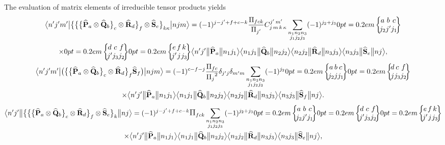 The evaluation of matrix elements of irreducible tensor products yields
\begin{gather}
\braOket{ n^{\prime} j^{\prime} m^{\prime}}{\bigl\{\bigl\{\bigl\{\widehat{\vect{P}}_{a} \otimes \widehat{\vect{Q}}_{b}\bigr\}_{c} \otimes \widehat{\vect{R}}_{d}\bigr\}_{f} \otimes \widehat{\vect{S}}_{e}\bigr\}_{k \kappa}}{n j m}=(-1)^{j-j^{\prime}+f+c-k} \frac{\Fact{f c k}}{\Fact{j^{\prime}}} 
\clebsch{j}{m}{k}{\kappa}{j^{\prime}}{m^{\prime}} \sum_{\substack{n_{1} n_{2} n_{3} \\
j_{1} j_{2} j_{3}}}(-1)^{j_{2}+j_{3}}
\sixj{a}{b}{c}{j_{2}}{j^{\prime}}{j_{1}} \notag\\
\times
\sixj{d}{c}{f}{j^{\prime}}{j_{3}}{j_{2}}
\sixj{e}{f}{k}{j^{\prime}}{j}{j_{3}}
\braOketred{ n^{\prime} j^{\prime}}{\widehat{\vect{P}}_{a}}{ n_{1} j_{1}}
\braOketred{ n_{1} j_{1}}{\widehat{\vect{Q}}_{b}}{ n_{2} j_{2}}
\braOketred{ n_{2} j_{2}}{\widehat{\vect{R}}_{d}}{ n_{3} j_{3}}
\braOketred{ n_{3} j_{3}}{\widehat{\vect{S}}_{e}}{ n j},  \label{eq:13:1:16}\\
\braOket{ n^{\prime} j^{\prime} m^{\prime}}{\bigl(\bigl\{\bigl\{\widehat{\vect{P}}_{a} \otimes \widehat{\vect{Q}}_{b}\bigr\}_{c} \otimes \widehat{\vect{R}}_{d}\bigr\}_{f}  \widehat{\vect{S}}_{f}\bigr)}{n j m}=(-1)^{c-f-j} \frac{\Fact{f c}}{\Fact{j}^{2}} \delta_{j^{\prime} j} \delta_{m^{\prime} m} \sum_{\substack{n_{1} n_{2} n_{3} \\
j_{1} j_{2} j_{3}}}(-1)^{j_{2}} 
\sixj{a}{b}{c}{j_{2}}{j}{j_{1}}
\sixj{d}{c}{f}{j}{j_{3}}{j_{2}} \notag\\
\times
\braOketred{ n^{\prime} j^{\prime}}{\widehat{\vect{P}}_{a}}{ n_{1} j_{1}}
\braOketred{ n_{1} j_{1}}{\widehat{\vect{Q}}_{b}}{ n_{2} j_{2}}
\braOketred{ n_{2} j_{2}}{\widehat{\vect{R}}_{d}}{ n_{3} j_{3}}
\braOketred{ n_{3} j_{3}}{\widehat{\vect{S}}_{f}}{ n j}. \label{eq:13:1:17}
\end{gather}
\begin{multline*}
\braOketred{ n^{\prime} j^{\prime}}{\bigl\{\bigl\{\bigl\{\widehat{\vect{P}}_{a} \otimes \widehat{\vect{Q}}_{b}\bigr\}_{c} \otimes \widehat{\vect{R}}_{d}\bigr\}_{f} \otimes \widehat{\vect{S}}_{e}\bigr\}_{k}}{n j}=(-1)^{j-j^{\prime}+f+c-k} \Fact{f c k}
\sum_{\substack{n_{1} n_{2} n_{3} \\ j_{1} j_{2} j_{3}}}(-1)^{j_{2}+j_{3}}
\sixj{a}{b}{c}{j_{2}}{j^{\prime}}{j_{1}}
\sixj{d}{c}{f}{j^{\prime}}{j_{3}}{j_{2}}
\sixj{e}{f}{k}{j^{\prime}}{j}{j_{3}} \\
\times
\braOketred{ n^{\prime} j^{\prime}}{\widehat{\vect{P}}_{a}}{ n_{1} j_{1}}
\braOketred{ n_{1} j_{1}}{\widehat{\vect{Q}}_{b}}{ n_{2} j_{2}}
\braOketred{ n_{2} j_{2}}{\widehat{\vect{R}}_{d}}{ n_{3} j_{3}}
\braOketred{ n_{3} j_{3}}{\widehat{\vect{S}}_{e}}{ n j},
\end{multline*}
